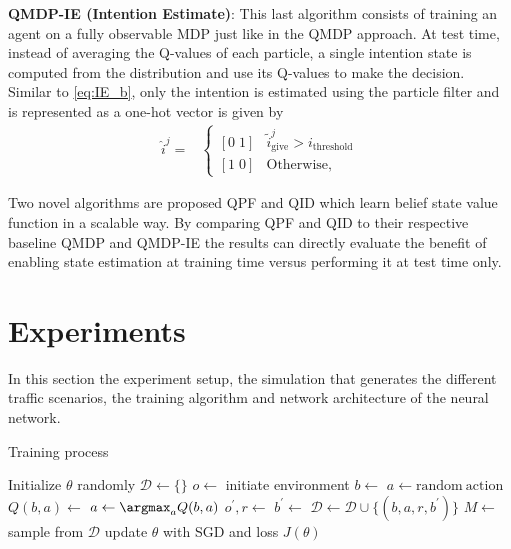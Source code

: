 	\textbf{QMDP-IE (Intention Estimate)}: This last algorithm consists of training an agent on a fully observable MDP just like in the QMDP approach. At test time, instead of averaging the Q-values of each particle, a single intention state is computed from the distribution and use its Q-values to make the decision. Similar to \ref{eq:IE_b}, only the intention is estimated using the particle filter and is represented as a one-hot vector is given by 
	\begin{align}
	\hat{i}^j = & \begin{cases}
	[0 \; 1] & \tilde{i}^j_\text{give} > i_\text{threshold}\\
	[1 \; 0] & \text{Otherwise,}
	\label{eq:IE_i}
	\end{cases} 
	\end{align}
	
	
	Two novel algorithms are proposed QPF and QID which learn belief state value function in a scalable way. 
	By comparing QPF and QID to their respective baseline QMDP and QMDP-IE the results can directly evaluate the benefit of enabling state estimation at training time versus performing it at test time only.
	
	
	
	\section{Experiments}
	\label{sec:experiments}
	In this section the experiment setup, the simulation that generates the different traffic scenarios, the training algorithm and network architecture of the neural network.   
	
	
	\begin{algorithm}[!t]
		\caption{Training process}\label{alg:training_process}
		\begin{algorithmic}[1]
			\State Initialize $\theta$ randomly
			\State $\mathcal{D} \gets \{\}$
				\State $o \gets $ initiate environment
				\State $b \gets $ 
						\State $a \gets \mathrm{random\ action}$
					\Else
						\State $Q(b, a) \gets $
						\State $a \gets \argmax_{a} Q(b,a)$
					\EndIf
					\State $o^\prime, r \gets $ 
					\State $b^\prime \gets $ 
					   \State $\mathcal{D} \gets \mathcal{D} \cup \{(b, a, r, b^\prime)\}$
					   \State $M \gets $ sample from $\mathcal{D}$
					   \State update $\theta$ with SGD and loss $J(\theta)$ 
				\EndWhile
			\EndFor
		\end{algorithmic}
	\end{algorithm}
	

